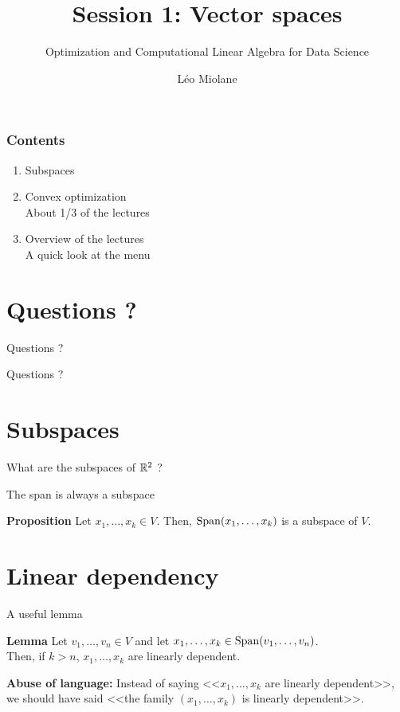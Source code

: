 \documentclass{beamer}
\title{Session 1: Vector spaces}
\subtitle{Optimization and Computational Linear Algebra for Data Science}
\author{Léo Miolane}
\date{}
\begin{document}
\setcounter{showProgressBar}{0}
\setcounter{showSlideNumbers}{0}

\frame{\titlepage}

\begin{frame}
	\frametitle{Contents}
	\begin{enumerate}
		\item Subspaces
		\item Convex optimization  \\ \textcolor{ExecusharesGrey}{\footnotesize\hspace{1em} About 1/3 of the lectures}
		\item Overview of the lectures \\ \textcolor{ExecusharesGrey}{\footnotesize\hspace{1em} A quick look at the menu}
	\end{enumerate}
\end{frame}


\setcounter{framenumber}{0}
\setcounter{showSlideNumbers}{1}

\section{Questions ?}
\begin{frame}[t]{Questions ?}
\end{frame}
\begin{frame}[t]{Questions ?}
\end{frame}

\section{Subspaces}
\begin{frame}{What are the subspaces of $\mathbb{R}^2$ ?}
\end{frame}

\begin{frame}[t]{The span is always a subspace}
	\begin{block}{\bf Proposition}
		Let $x_1, \dots, x_k \in V$. Then, ${{\rm Span}}(x_1, \dots, x_k)$ is a subspace of $V$.
	\end{block}
\end{frame}

\section{Linear dependency}
\begin{frame}[t]{A useful lemma}
	\vspace{-0.4cm}
	\begin{block}{\bf Lemma}
		Let $v_1, \dots, v_n \in V$
		and let $x_1, \dots, x_k \in {{\rm Span}}(v_1, \dots, v_n)$.
		\\
		Then, if $k > n$,
		$x_1, \dots, x_k$ are linearly dependent.
	\end{block}
	\textbf{Abuse of language:} Instead of saying <<$x_1, \dots, x_k$ are linearly dependent>>, we should have said <<the family $(x_1, \dots, x_k)$ is linearly dependent>>.
\end{frame}
\end{document}
